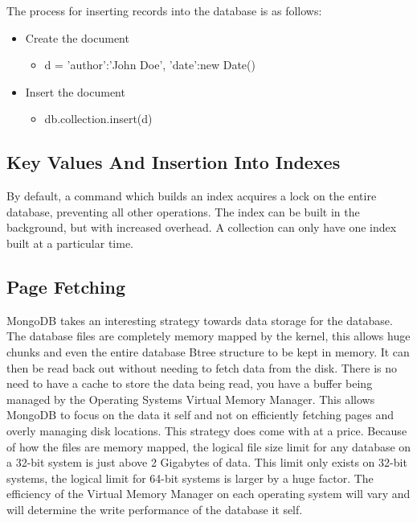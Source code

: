 \documentclass{dependencies/acm_proc_article-sp}
\begin{document}
The process for inserting records into the database is as follows:
\begin{itemize}
  \item Create the document
  \begin{itemize}
    \item d = {'author':'John Doe', 'date':new Date() }
  \end{itemize}

  \item Insert the document
  \begin{itemize}
    \item db.collection.insert(d)
  \end{itemize}
\end{itemize}

\subsection{Key Values And Insertion Into Indexes}
By default, a command which builds an index acquires a lock on the entire database,
preventing all other operations. The index can be built in the background,
but with increased overhead.
A collection can only have one index built at a particular time\cite{7}.
\subsection{Page Fetching}
MongoDB takes an interesting strategy towards data storage for the database.
The database files are completely memory mapped by the kernel, this allows huge chunks and
even the entire database Btree structure to be kept in memory.
It can then be read back out without needing to fetch data from the disk\cite{16}.
There is no need to have a cache to store the data being read, you have a buffer being managed
by the Operating Systems Virtual Memory Manager. This allows MongoDB to focus on the data it self
and not on efficiently fetching pages and overly managing disk locations. This strategy does come with
at a price. Because of how the files are memory mapped, the logical file size limit for any database
on a 32-bit system is just above 2 Gigabytes of data. This limit only exists on 32-bit systems, the
logical limit for 64-bit systems is larger by a huge factor. The efficiency of the
Virtual Memory Manager on each operating system will vary and will determine the write performance
of the database it self.
\end{document}

